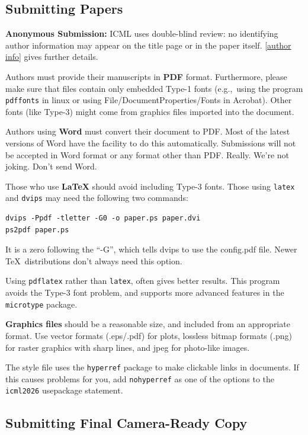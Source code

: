 \documentclass{article}
\theoremstyle{plain}
\theoremstyle{definition}
\theoremstyle{remark}
\begin{document}
\subsection{Submitting Papers}

\textbf{Anonymous Submission:} ICML uses double-blind review: no identifying
author information may appear on the title page or in the paper
itself. \cref{author info} gives further details.

\medskip

Authors must provide their manuscripts in \textbf{PDF} format.
Furthermore, please make sure that files contain only embedded Type-1 fonts
(e.g.,~using the program \texttt{pdffonts} in linux or using
File/DocumentProperties/Fonts in Acrobat). Other fonts (like Type-3)
might come from graphics files imported into the document.

Authors using \textbf{Word} must convert their document to PDF\@. Most
of the latest versions of Word have the facility to do this
automatically. Submissions will not be accepted in Word format or any
format other than PDF\@. Really. We're not joking. Don't send Word.

Those who use \textbf{\LaTeX} should avoid including Type-3 fonts.
Those using \texttt{latex} and \texttt{dvips} may need the following
two commands:

{\footnotesize
\begin{verbatim}
dvips -Ppdf -tletter -G0 -o paper.ps paper.dvi
ps2pdf paper.ps
\end{verbatim}}
It is a zero following the ``-G'', which tells dvips to use
the config.pdf file. Newer \TeX\ distributions don't always need this
option.

Using \texttt{pdflatex} rather than \texttt{latex}, often gives better
results. This program avoids the Type-3 font problem, and supports more
advanced features in the \texttt{microtype} package.

\textbf{Graphics files} should be a reasonable size, and included from
an appropriate format. Use vector formats (.eps/.pdf) for plots,
lossless bitmap formats (.png) for raster graphics with sharp lines, and
jpeg for photo-like images.

The style file uses the \texttt{hyperref} package to make clickable
links in documents. If this causes problems for you, add
\texttt{nohyperref} as one of the options to the \texttt{icml2026}
usepackage statement.

\subsection{Submitting Final Camera-Ready Copy}
\end{document}
